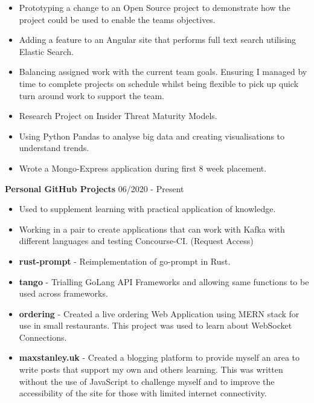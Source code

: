 \documentclass{article}
\begin{document}
\begin{multicols}{2}
\begin{itemize}
\itemsep0em
	\item Prototyping a change to an Open Source project to demonstrate how the project could be used to enable the teams objectives.
	\item Adding a feature to an Angular site that performs full text search utilising Elastic Search.
	\item Balancing assigned work with the current team goals. Ensuring I managed by time to complete projects on schedule whilst being flexible to pick up quick turn around work to support the team.
	\item Research Project on Insider Threat Maturity Models.
	\item Using Python Pandas to analyse big data and creating visualisations to understand trends.
	\item Wrote a Mongo-Express application during first 8 week placement.
\end{itemize}
\end{multicols}

\textbf{Personal GitHub Projects} \hfill 06/2020 - Present

\begin{multicols}{2}
\begin{itemize}
\itemsep0em
	\item Used to supplement learning with practical application of knowledge.
	\item Working in a pair to create applications that can work with Kafka with different languages and testing Concourse-CI. (Request Access)
	\item \textbf{rust-prompt} - Reimplementation of go-prompt in Rust.
	\item \textbf{tango} - Trialling GoLang API Frameworks and allowing same functions to be used across frameworks.
	\item \textbf{ordering} - Created a live ordering Web Application using MERN stack for use in small restaurants. This project was used to learn about WebSocket Connections.
	\item \textbf{maxstanley.uk} - Created a blogging platform to provide myself an area to write posts that support my own and others learning. This was written without the use of JavaScript to challenge myself and to improve the accessibility of the site for those with limited internet connectivity.
\end{itemize}
\end{multicols}
\end{document}

